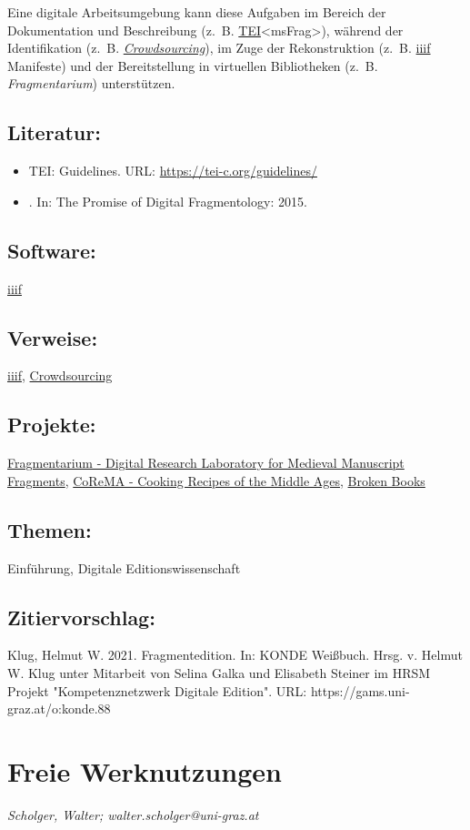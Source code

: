 \documentclass{article}
\begin{document}
        Eine digitale Arbeitsumgebung kann diese Aufgaben im Bereich der Dokumentation und Beschreibung (z. B. \href{http://gams.uni-graz.at/o:konde.178}{TEI}<msFrag>), während der Identifikation (z. B. \emph{\href{http://gams.uni-graz.at/o:konde.47}{Crowdsourcing}}), im Zuge der Rekonstruktion (z. B. \href{http://gams.uni-graz.at/o:konde.123}{iiif} Manifeste) und der Bereitstellung in virtuellen Bibliotheken (z. B. \emph{Fragmentarium}) unterstützen.\\
            
        \subsection*{Literatur:}\begin{itemize}\item TEI: Guidelines. URL: \url{https://tei-c.org/guidelines/}\item . In: The Promise of Digital Fragmentology: 2015.\end{itemize}\subsection*{Software:}\href{https://iiif.io/}{iiif}\subsection*{Verweise:}\href{https://gams.uni-graz.at/o:konde.123}{iiif}, \href{https://gams.uni-graz.at/o:konde.47}{Crowdsourcing}\subsection*{Projekte:}\href{https://www.fragmentarium.ms}{Fragmentarium - Digital Research Laboratory for Medieval Manuscript Fragments}, \href{https://gams.uni-graz.at/corema}{CoReMA - Cooking Recipes of the Middle Ages}, \href{https://brokenbooks.omeka.net/}{Broken Books}\subsection*{Themen:}Einführung, Digitale Editionswissenschaft\subsection*{Zitiervorschlag:}Klug, Helmut W. 2021. Fragmentedition. In: KONDE Weißbuch. Hrsg. v. Helmut W. Klug unter Mitarbeit von Selina Galka und Elisabeth Steiner im HRSM Projekt "Kompetenznetzwerk Digitale Edition". URL: https://gams.uni-graz.at/o:konde.88\newpage\section*{Freie Werknutzungen} \emph{Scholger, Walter; walter.scholger@uni-graz.at }\\
        
\end{document}
